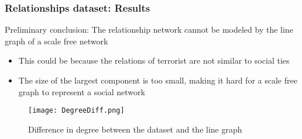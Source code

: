
\begin{frame}
\frametitle{Relationships dataset: Results}


Preliminary conclusion: The relationship network cannot be modeled by the line graph of a scale free network
\begin{itemize}
\item This could be because the relations of terrorist are not similar to social ties
\item The size of the largest component is too small, making it hard for a scale free graph to represent a social network
\end{itemize}


\begin{figure}[H]
\begin{center}
\texttt{[image: DegreeDiff.png]}
\caption{Difference in degree between the dataset and the line graph}
\label{fig:degdiff}
\end{center}
\end{figure}
\end{frame}

